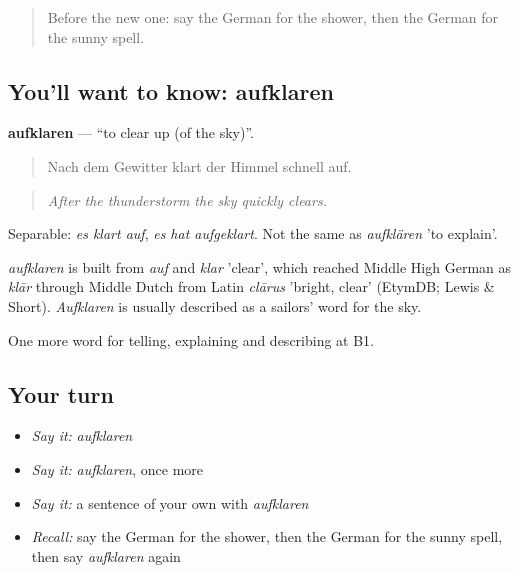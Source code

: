 \label{lesson:GE-C461-aufklaren}



\begin{quote}
Before the new one: say the German for the shower, then the German for the sunny spell.
\end{quote}

\subsection*{You'll want to know: aufklaren}
\textbf{aufklaren} — \textquotedblleft{}to clear up (of the sky)\textquotedblright{}.

\begin{quote}
Nach dem Gewitter klart der Himmel schnell auf.
\end{quote}

\begin{quote}
\emph{After the thunderstorm the sky quickly clears.}
\end{quote}

Separable: \emph{es klart auf}, \emph{es hat aufgeklart}. Not the same as \emph{aufklären} 'to explain'.

\begin{cousinweb}
\emph{aufklaren} is built from \emph{auf} and \emph{klar} 'clear', which reached Middle High German as \emph{klār} through Middle Dutch from Latin \emph{clārus} 'bright, clear' (EtymDB; Lewis \& Short). \emph{Aufklaren} is usually described as a sailors' word for the sky.
\end{cousinweb}

\begin{grammarlens}[title={What you've built}]
One more word for telling, explaining and describing at B1.
\end{grammarlens}

\subsection*{Your turn}
\begin{itemize}
\raggedright
  \item \emph{Say it:} \emph{aufklaren}
  \item \emph{Say it:} \emph{aufklaren}, once more
  \item \emph{Say it:} a sentence of your own with \emph{aufklaren}
  \item \emph{Recall:} say the German for the shower, then the German for the sunny spell, then say \emph{aufklaren} again
\end{itemize}

